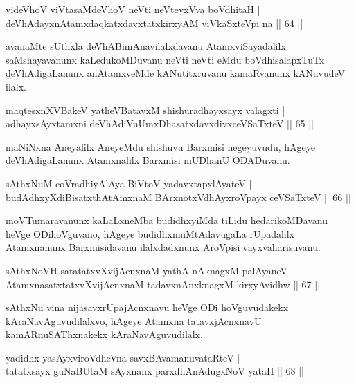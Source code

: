 \begin{shl}
videVhoV viVtasaMdeVhoV neVti neVteyxVva boVdhitaH |\\
deVhAdayxnAtamxdaqkatxdavxtatxkirxyAM viVkaSxteV\s pi na \hfill || 64 ||
\end{shl}

\begin{artha}
avanaMte sUthxla deVhABimAnavilalxdavanu AtamxviSayadalilx saMshayavanunx kaLedukoMDuvanu neVti neVti eMdu boVdhisalapxTuTx deVhAdigaLanunx anAtamxveMde kANutitxruvanu kamaRvanunx kANuvudeV ilalx.
\end{artha}

\begin{shl}
maqtesxnXVBakeV yatheVBatavxM shishuradhayxsayx valagxti |\\
adhayxsAyx\s \s tamxni deVhAdiVnUmxDhasatxdavxdivxceVSaTxteV \hfill || 65 ||
\end{shl}

\begin{artha}
maNiNxna Aneyalilx AneyeMdu shishuvu Barxmisi negeyuvudu, hAgeye deVhAdigaLanunx Atamxnalilx Barxmisi mUDhanU ODADuvanu.
\end{artha}

\begin{shl}
sAthxNuM coVradhiyA\s \s lAya BiVtoV yadavxtapxlAyateV |\\
budAdhxyXdiBisatxthA\s \s tAmxnaM BArxnotxV\s dhAyxroVpayx ceVSaTxteV \hfill || 66 ||
\end{shl}

\begin{artha}
moVTumaravanunx kaLaLxneMba budidhxyiMda tiLidu hedarikoMDavanu heVge ODihoVguvano, hAgeye budidhxmuMtAdavugaLa rUpadalilx Atamxnanunx Barxmisidavanu ilalxdadxnunx AroVpisi vayxvaharisuvanu.
\end{artha}

\begin{shl}
sAthxNoVH satatatxvXvijAcnxnaM yathA nAknagxM palAyaneV |\\
AtamxnasatxtatxvXvijAcnxnaM tadavxnAnxknagxM kirxyAvidhw \hfill || 67 ||
\end{shl}

\begin{artha}
sAthxNu vina nijasavxrUpajAcnxnavu heVge ODi hoVguvudakekx kAraNavAguvudilalxvo, hAgeye Atamxna tatavxjAcnxnavU kamARnuSAThxnakekx kAraNavAguvudilalx.
\end{artha}

\begin{shl}
yadidhx yasAyxviroVdheVna savxBAvamanuvataRteV |\\
tatatxsayx guNaBUtaM sAyxnanx parxdhAnAdugxNoV yataH \hfill || 68 ||
\end{shl}

